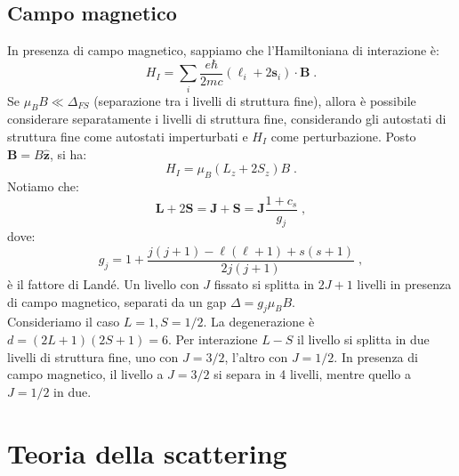 \documentclass[12pt,a4paper]{report}
\theoremstyle{definition}
\numberwithin{equation}{section}
\begin{document}
\section{Campo magnetico}
In presenza di campo magnetico, sappiamo che l'Hamiltoniana di interazione è:
\begin{equation}
H_I=\sum_i \frac{e\hbar}{2mc}(\boldsymbol{\ell}_i+2\mathbf{s}_i)\cdot\mathbf{B}\;.
\end{equation}
Se $\mu_BB\ll\Delta_{FS}$ (separazione tra i livelli di struttura fine), allora è possibile considerare separatamente i livelli di struttura fine, considerando gli autostati di struttura fine come autostati imperturbati e $H_I$ come perturbazione. Posto $\mathbf{B}=B\hat{\mathbf{z}}$, si ha:
$$
H_I=\mu_B(L_z+2S_z)B\;.
$$
Notiamo che:
\begin{equation}
\mathbf{L}+2\mathbf{S}=\mathbf{J}+\mathbf{S}=\mathbf{J}\frac{1+c_s}{g_j}\;,
\end{equation}
dove:
\begin{equation}
g_j=1+\frac{j(j+1)-\ell(\ell+1)+s(s+1)}{2j(j+1)}\;,
\end{equation}
è il fattore di Landé. Un livello con $J$ fissato si splitta in $2J+1$ livelli in presenza di campo magnetico, separati da un gap $\Delta=g_j\mu_BB$. \\
Consideriamo il caso $L=1,S=1/2$. La degenerazione è $d=(2L+1)(2S+1)=6$. Per interazione $L-S$ il livello si splitta in due livelli di struttura fine, uno con $J=3/2$, l'altro con $J=1/2$. In presenza di campo magnetico, il livello a $J=3/2$ si separa in 4 livelli, mentre quello a $J=1/2$ in due.
\chapter{Teoria della scattering}
\end{document}
